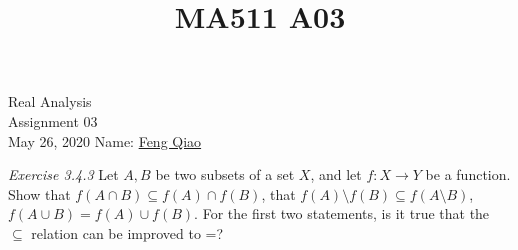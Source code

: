 \documentclass[12pt]{article}
\title{MA511 A03}
\newcommand{\ra}{\rightarrow}
\begin{document}
\begin{flushleft}
{\sc \Large Real Analysis} \\ 
\medskip
Assignment 03\\
May 26, 2020
\hfill Name: \underline{Feng Qiao} \\

\setdefaultleftmargin{0pt}{}{}{}{}{}

\textit{Exercise 3.4.3} Let \(A,B\) be two subsets of a set \(X\), and let \(f : X \ra Y\) be a function. Show that \(f(A \cap B) \subseteq f(A) \cap f(B)\), that \(f(A)\setminus f(B) \subseteq f(A\setminus B)\), \(f(A \cup B) = f(A) \cup f(B)\). For the first two statements, is it true that the \(\subseteq\) relation can be improved to =?

\end{flushleft}
\end{document}
